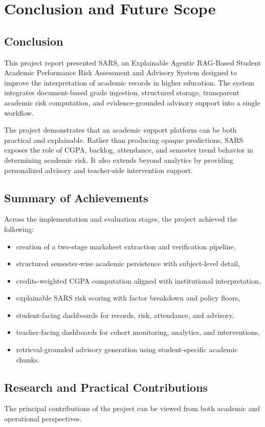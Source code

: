 \chapter{Conclusion and Future Scope}

\section{Conclusion}
This project report presented SARS, an Explainable Agentic RAG-Based Student Academic Performance Risk Assessment and Advisory System designed to improve the interpretation of academic records in higher education. The system integrates document-based grade ingestion, structured storage, transparent academic risk computation, and evidence-grounded advisory support into a single workflow.

The project demonstrates that an academic support platform can be both practical and explainable. Rather than producing opaque predictions, SARS exposes the role of CGPA, backlog, attendance, and semester trend behavior in determining academic risk. It also extends beyond analytics by providing personalized advisory and teacher-side intervention support.

\section{Summary of Achievements}
Across the implementation and evaluation stages, the project achieved the following:
\begin{itemize}[leftmargin=*]
\item creation of a two-stage marksheet extraction and verification pipeline,
\item structured semester-wise academic persistence with subject-level detail,
\item credits-weighted CGPA computation aligned with institutional interpretation,
\item explainable SARS risk scoring with factor breakdown and policy floors,
\item student-facing dashboards for records, risk, attendance, and advisory,
\item teacher-facing dashboards for cohort monitoring, analytics, and interventions,
\item retrieval-grounded advisory generation using student-specific academic chunks.
\end{itemize}

\section{Research and Practical Contributions}
The principal contributions of the project can be viewed from both academic and operational perspectives.

